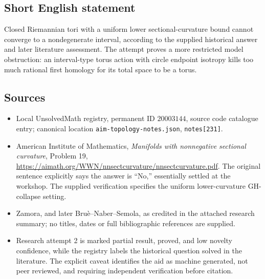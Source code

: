 \documentclass[11pt]{article}
\begin{document}
\subsection{Short English statement}
Closed Riemannian tori with a uniform lower sectional-curvature bound cannot converge to a nondegenerate interval, according to the supplied historical answer and later literature assessment. The attempt proves a more restricted model obstruction: an interval-type torus action with circle endpoint isotropy kills too much rational first homology for its total space to be a torus.
\subsection{Sources}
\begin{itemize}
\item Local UnsolvedMath registry, permanent ID $20003144$, source code catalogue entry; canonical location \texttt{aim-topology-notes.json}, \texttt{notes[231]}.
\item American Institute of Mathematics, \emph{Manifolds with nonnegative sectional curvature}, Problem 19, \url{https://aimath.org/WWN/nnsectcurvature/nnsectcurvature.pdf}. The original sentence explicitly says the answer is ``No,'' essentially settled at the workshop. The supplied verification specifies the uniform lower-curvature GH-collapse setting.
\item Zamora, and later Bru\`e--Naber--Semola, as credited in the attached research summary; no titles, dates or full bibliographic references are supplied.
\item Research attempt 2 is marked partial result, proved, and low novelty confidence, while the registry labels the historical question solved in the literature. The explicit caveat identifies the aid as machine generated, not peer reviewed, and requiring independent verification before citation.
\end{itemize}
\end{document}
